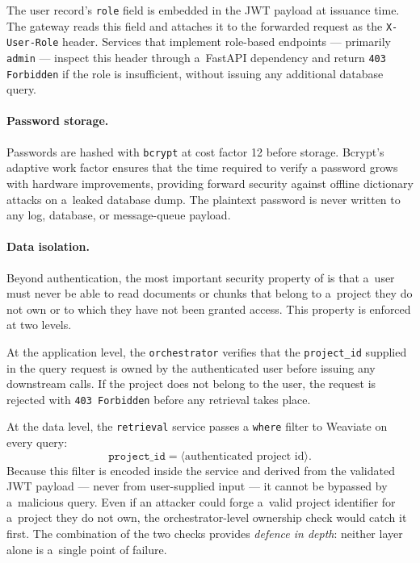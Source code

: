 The user record's \texttt{role} field is embedded in the JWT payload at
issuance time.  The gateway reads this field and attaches it to the
forwarded request as the \texttt{X-User-Role} header.  Services that
implement role-based endpoints --- primarily \texttt{admin} --- inspect this
header through a~FastAPI dependency and return \texttt{403 Forbidden} if
the role is insufficient, without issuing any additional database query.

\paragraph{Password storage.}
Passwords are hashed with \texttt{bcrypt} at cost factor 12 before storage.
Bcrypt's adaptive work factor ensures that the time required to verify a
password grows with hardware improvements, providing forward security against
offline dictionary attacks on a~leaked database dump.  The plaintext password
is never written to any log, database, or message-queue payload.

\paragraph{Data isolation.}
Beyond authentication, the most important security property of \medrag{}
is that a~user must never be able to read documents or chunks that belong
to a~project they do not own or to which they have not been granted access.
This property is enforced at two levels.

At the application level, the \texttt{orchestrator} verifies that the
\texttt{project\_id} supplied in the query request is owned by the
authenticated user before issuing any downstream calls.  If the project
does not belong to the user, the request is rejected with
\texttt{403 Forbidden} before any retrieval takes place.

At the data level, the \texttt{retrieval} service passes a
\texttt{where} filter to Weaviate on every query:
\begin{equation*}
  \texttt{project\_id} = \langle \text{authenticated project id} \rangle.
\end{equation*}
Because this filter is encoded inside the service and derived from the
validated JWT payload --- never from user-supplied input --- it cannot be
bypassed by a~malicious query.  Even if an attacker could forge a~valid
project identifier for a~project they do not own, the orchestrator-level
ownership check would catch it first.  The combination of the two checks
provides \emph{defence in depth}: neither layer alone is a~single point
of failure.

